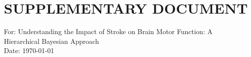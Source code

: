 \documentclass[12pt,titlepage,fleqn]{article}
\newcommand{\1}{{\bm 1}}
\begin{document}
\doublespace
\section*{\uppercase{Supplementary Document}}
\setcounter{page}{1}
\setcounter{figure}{0}
\renewcommand{\theequation}{A\arabic{equation}}
\setcounter{equation}{0}  %

{\large For: Understanding the Impact of Stroke on Brain Motor Function: A Hierarchical Bayesian Approach}\\
Date: \today

\end{document}

